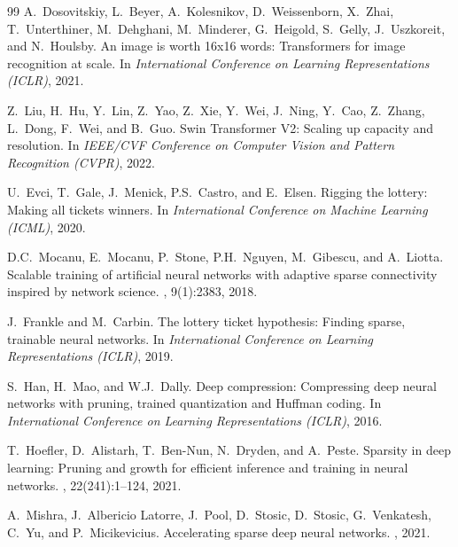 \documentclass[11pt, a4paper]{article}
\begin{document}
\begin{thebibliography}{99}
A.~Dosovitskiy, L.~Beyer, A.~Kolesnikov, D.~Weissenborn, X.~Zhai, T.~Unterthiner, M.~Dehghani, M.~Minderer, G.~Heigold, S.~Gelly, J.~Uszkoreit, and N.~Houlsby.
\newblock An image is worth 16x16 words: Transformers for image recognition at scale.
\newblock In {\em International Conference on Learning Representations (ICLR)}, 2021.

Z.~Liu, H.~Hu, Y.~Lin, Z.~Yao, Z.~Xie, Y.~Wei, J.~Ning, Y.~Cao, Z.~Zhang, L.~Dong, F.~Wei, and B.~Guo.
\newblock Swin Transformer V2: Scaling up capacity and resolution.
\newblock In {\em IEEE/CVF Conference on Computer Vision and Pattern Recognition (CVPR)}, 2022.


U.~Evci, T.~Gale, J.~Menick, P.S.~Castro, and E.~Elsen.
\newblock Rigging the lottery: Making all tickets winners.
\newblock In {\em International Conference on Machine Learning (ICML)}, 2020.

D.C.~Mocanu, E.~Mocanu, P.~Stone, P.H.~Nguyen, M.~Gibescu, and A.~Liotta.
\newblock Scalable training of artificial neural networks with adaptive sparse connectivity inspired by network science.
, 9(1):2383, 2018.

J.~Frankle and M.~Carbin.
\newblock The lottery ticket hypothesis: Finding sparse, trainable neural networks.
\newblock In {\em International Conference on Learning Representations (ICLR)}, 2019.

S.~Han, H.~Mao, and W.J.~Dally.
\newblock Deep compression: Compressing deep neural networks with pruning, trained quantization and Huffman coding.
\newblock In {\em International Conference on Learning Representations (ICLR)}, 2016.

T.~Hoefler, D.~Alistarh, T.~Ben-Nun, N.~Dryden, and A.~Peste.
\newblock Sparsity in deep learning: Pruning and growth for efficient inference and training in neural networks.
, 22(241):1--124, 2021.


A.~Mishra, J.~Albericio Latorre, J.~Pool, D.~Stosic, D.~Stosic, G.~Venkatesh, C.~Yu, and P.~Micikevicius.
\newblock Accelerating sparse deep neural networks.
, 2021.


\end{thebibliography}
\end{document}
